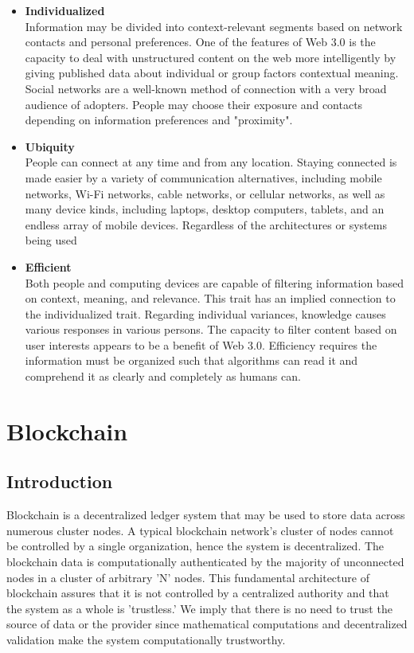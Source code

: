 \begin{itemize}

    \item \textbf{Individualized} \\
    Information may be divided into context-relevant segments based on network contacts and personal preferences. One of the features of Web 3.0 is the capacity to deal with unstructured content on the web more intelligently by giving published data about individual or group factors contextual meaning. Social networks are a well-known method of connection with a very broad audience of adopters. People may choose their exposure and contacts depending on information preferences and "proximity".

\vspace{.5cm}

    \item \textbf{Ubiquity} \\
  People can connect at any time and from any location. Staying connected is made easier by a variety of communication alternatives, including mobile networks, Wi-Fi networks, cable networks, or cellular networks, as well as many device kinds, including laptops, desktop computers, tablets, and an endless array of mobile devices. Regardless of the architectures or systems being used


\vspace{.5cm}


    \item \textbf{Efficient} \\
    Both people and computing devices are capable of filtering information based on context, meaning, and relevance. This trait has an implied connection to the individualized trait. Regarding individual variances, knowledge causes various responses in various persons. The capacity to filter content based on user interests appears to be a benefit of Web 3.0. Efficiency requires the information must be organized such that algorithms can read it and comprehend it as clearly and completely as humans can.

\end{itemize}
\section{Blockchain}

\subsection{Introduction}
Blockchain is a decentralized ledger system that may be used to store data across numerous cluster nodes. A typical blockchain network's cluster of nodes cannot be controlled by a single organization, hence the system is decentralized. The blockchain data is computationally authenticated by the majority of unconnected nodes in a cluster of arbitrary 'N' nodes. This fundamental architecture of blockchain assures that it is not controlled by a centralized authority and that the system as a whole is 'trustless.' We imply that there is no need to trust the source of data or the provider since mathematical computations and decentralized validation make the system computationally trustworthy.

